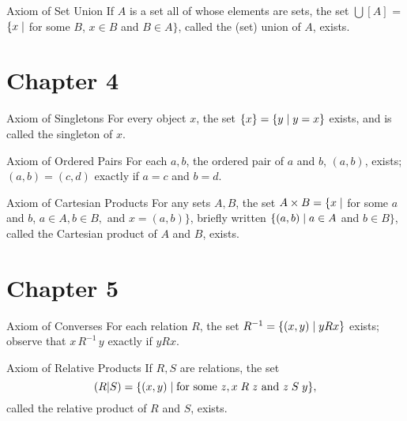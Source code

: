 \pagebreak
  
\begin{axiom}{Axiom of Set Union}
 If $A$ is a set all of whose elements are sets, the
 set $\bigcup[A]$ = $\{x \mid$ for some $B$, $x \in B$ and $B \in A\}$, called
 the (set) union of $A$, exists.
\end{axiom}


\vspace{-.6\baselineskip}

\section *{Chapter 4}


\begin{axiom}{Axiom of
Singletons}
 For every object $x$, the set $\{x\} = \{y \mid y = x\}$
 exists, and is called the {\upshape singleton} of $x$.
\end{axiom}

\begin{axiom}{Axiom of Ordered Pairs}
 For each $a, b$, the {\upshape ordered pair of $a$ and $b$},
 $(a,b)$, exists; $(a,b) = (c,d)$ exactly if $a = c$ and $b = d$.
\end{axiom}

\begin{axiom}{Axiom of Cartesian Products}
 For any sets $A,B$, the set $A \times B = \{x \mid$
 for some $a$ and $b$, $ a \in A, b \in B,$ and $x = (a,b)\}$, briefly written
 $\{(a,b) \mid a \in A$ and $b \in B\}$, called the {\upshape Cartesian product}
 of $A$ and $B$, exists.
\end{axiom}


\vspace{-.6\baselineskip}

\section *{Chapter 5}

\begin{axiom}{Axiom of Converses%
}
 For each relation $R$, the set $R^{-1} = \{(x,y) \mid y R
 x\}$ exists; observe that $x \,R^{-1}\, y$ exactly if $y R x$.
\end{axiom}

\begin{axiom}{Axiom of Relative Products}
 If $R,S$ are relations, the set
 $$
   (R|S) =
   \{(x,y) \mid \mbox{for some $z, x \mathrel{R} z$ and $z \mathrel{S} y$}\},
 $$
 called the {\upshape relative
 product} of $R$ and $S$, exists.
\end{axiom}


